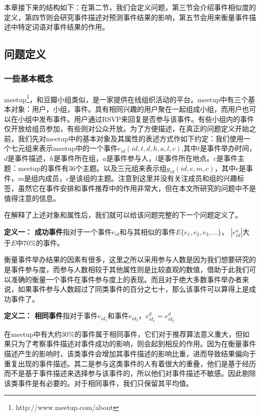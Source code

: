 本章接下来的结构如下：在第二节，我们会定义问题，第三节会介绍事件相似度的定义，第四节则会研究事件描述对预测事件结果的影响，第五节会用来衡量事件描述中特定词语对事件结果的作用。

\subsection{问题定义}
\subsubsection{一些基本概念}
meetup\footnote{http://www.meetup.com/about}，和豆瓣小组类似，是一家提供在线组织活动的平台。meetup中有三个基本对象：用户，小组，事件。具有相同兴趣的用户聚在一起组成小组，而用户也可以在小组中发布事件。用户通过RSVP来回复是否参与该事件。有些小组内的事件仅开放给组员参加，有些则对公众开放。为了方便描述，在真正的问题定义开始之前，我们先对meetup中的基本对象及其属性的表述方式作如下约定：我们使用一个七元组来表示meetup中的一个事件\(e_{id}(id,t,d,h,a,l,c)\),其中\(t\)是事件举办时间，\(d\)是事件描述，\(h\)是事件所在组，\(a\)是事件参与人，\(l\)是事件所在地点。\(c\)是事件主题：meetup的事件有36个主题。以及三元组来表示组\(g_{id}(id,e,m,c)\)，其中\(e\)是事件，\(m\)是组内成员，\(c\)是该组的主题。注意到这里并没有关注成员和组的兴趣标签，虽然它在事件安排和事件推荐中的作用非常大，但在本文所研究的问题中不是值得注意的信息。

在解释了上述对象和属性后，我们就可以给该问题完整的下一个问题定义了。

\textbf{定义一： 成功事件}指对于一个事件\(e_{id}\)和与其相似的事件\(E\{e_1,e_2,e_3,...\}\)，
\(|e_{id}^a|\)大于\(E\)中\(70\)\%的事件。

衡量事件举办结果的因素有很多，这里之所以采用参与人数是因为我们想要研究的是事件参与度，而参与人数相较于其他属性则是比较直观的数值，借助于此我们可以准确的衡量一个事件在事件参与度上的表现。而且对于绝大多数事件举办者来说，如果事件参与人数超过了同类事件的百分之七十，那么该事件可以算得上是成功事件了。

\textbf{定义二： 相同事件}指对于事件\(e_{id_1}\)和事件\(e_{id_2}\)，\(e_{id_1}^d=e_{id_2}^d\)

在meetup中有大约30\%的事件属于相同事件，它们对于推荐算法意义重大，但如果只为了考察事件描述对事件成功的影响，则会起到相反的作用。因为在衡量事件描述产生的影响时，该类事件会增加其事件描述的影响比重，进而导致结果偏向于重复出现的事件描述。其二是参与这类事件的人有着很大的重叠，他们是基于经历而不是基于事件描述来选择参与该事件的，所以他们对事件描述不敏感。因此剔除该类事件是有必要的。对于相同事件，我们只保留其平均值。

